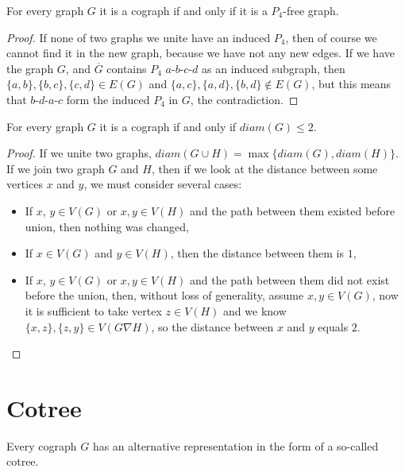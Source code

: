 \begin{theorem}
For every graph $G$ it is a cograph if and only if it is a $P_4$-free graph.
\end{theorem}
\begin{proof}
If none of two graphs we unite have an induced $P_4$, then of course we cannot find it in the new graph, because we have not any new edges. If we have the graph $G$, and $\overline{G}$ contains $P_4$ $a$-$b$-$c$-$d$ as an induced subgraph, then $\{a,b\}, \{b,c\}, \{c,d\} \in E(G)$ and $\{a,c\}, \{a,d\}, \{b, d\} \notin E(G)$, but this means that $b$-$d$-$a$-$c$ form the induced $P_4$ in $G$, the contradiction. 
\end{proof}

\begin{theorem}
For every graph $G$ it is a cograph if and only if $diam(G) \le 2$.
\end{theorem}
\begin{proof}
    If we unite two graphs, $diam(G \cup H) = \max\{diam(G), diam(H)\}$. If we join two graph $G$ and $H$, then if we look at the distance between some vertices $x$ and $y$, we must consider several cases:
    \begin{itemize}
        \item If $x$, $y \in V(G)$ or $x, y \in V(H)$ and the path between them existed before union, then nothing was changed,
        \item If $x \in V(G)$ and $y \in V(H)$, then the distance between them is $1$,
        \item If $x$, $y \in V(G)$ or $x, y \in V(H)$ and the path between them did not exist before the union, then, without loss of generality, assume $x, y \in V(G)$, now it is sufficient to take vertex $z \in V(H)$ and we know $\{x,z\}, \{z,y\} \in V(G \nabla H)$, so the distance between $x$ and $y$ equals $2$.
    \end{itemize}
\end{proof}


\section{Cotree}
Every cograph $G$ has an alternative representation in the form of a so-called cotree.

